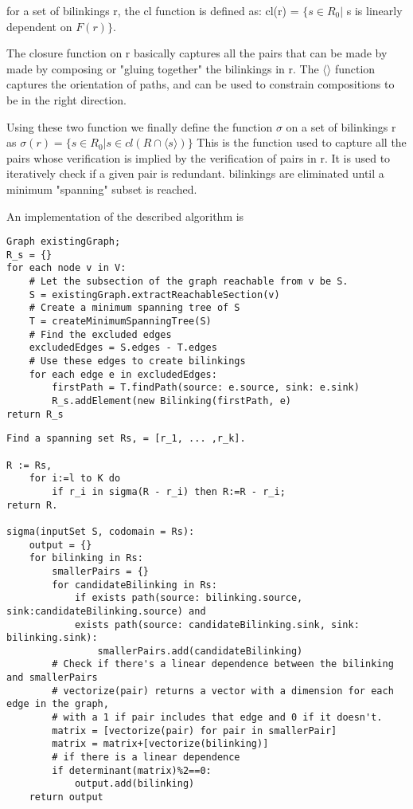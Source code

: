 \documentclass{article}
\begin{document}
for a set of bilinkings r, the cl function is defined as:
cl(r) = $\{ s\in R_0|$ s is linearly dependent on $F(r) \}$.

The closure function on r basically captures all the pairs that can be made by made by composing or "gluing together" the bilinkings in r. The $\langle\rangle$ function captures the orientation of paths, and can be used to constrain compositions to be in the right direction. 

Using these two function we finally define the function $\sigma$ on a set of bilinkings r as
$\sigma(r) = \{s \in R_0 | s\in cl(R\cap \langle s \rangle) \}$
This is the function used to capture all the pairs whose verification is implied by the verification of pairs in r.
It is used to iteratively check if a given pair is redundant. bilinkings are eliminated until a minimum "spanning" subset is reached.

An implementation of the described algorithm is

\begin{verbatim}
Graph existingGraph;
R_s = {}
for each node v in V:
    # Let the subsection of the graph reachable from v be S.
    S = existingGraph.extractReachableSection(v)
    # Create a minimum spanning tree of S
    T = createMinimumSpanningTree(S)
    # Find the excluded edges
    excludedEdges = S.edges - T.edges
    # Use these edges to create bilinkings
    for each edge e in excludedEdges:
        firstPath = T.findPath(source: e.source, sink: e.sink)
        R_s.addElement(new Bilinking(firstPath, e)
return R_s
\end{verbatim}

\begin{verbatim}
Find a spanning set Rs, = [r_1, ... ,r_k].

R := Rs,
    for i:=l to K do
        if r_i in sigma(R - r_i) then R:=R - r_i;
return R.

sigma(inputSet S, codomain = Rs):
    output = {}
    for bilinking in Rs:
        smallerPairs = {}
        for candidateBilinking in Rs:
            if exists path(source: bilinking.source, sink:candidateBilinking.source) and
            exists path(source: candidateBilinking.sink, sink: bilinking.sink):
                smallerPairs.add(candidateBilinking)
        # Check if there's a linear dependence between the bilinking and smallerPairs
        # vectorize(pair) returns a vector with a dimension for each edge in the graph,
        # with a 1 if pair includes that edge and 0 if it doesn't.
        matrix = [vectorize(pair) for pair in smallerPair]
        matrix = matrix+[vectorize(bilinking)]
        # if there is a linear dependence
        if determinant(matrix)%2==0:
            output.add(bilinking)
    return output
                
\end{verbatim}
\end{document}
